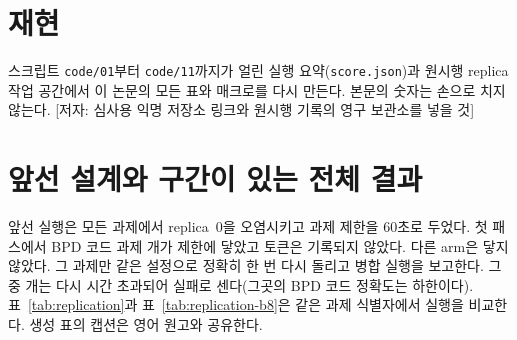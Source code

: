 \documentclass[11pt]{article}
\newcommand{\todo}[1]{{\color{red}[저자: #1]}}
\begin{document}
\section*{재현}
스크립트 \texttt{code/01}부터 \texttt{code/11}까지가 얼린 실행 요약(\texttt{score.json})과 원시행 replica 작업 공간에서 이 논문의 모든 표와 매크로를 다시 만든다. 본문의 숫자는 손으로 치지 않는다.
\todo{심사용 익명 저장소 링크와 원시행 기록의 영구 보관소를 넣을 것}




\appendix
\section{앞선 설계와 구간이 있는 전체 결과}
\label{app:full}
앞선 실행은 모든 과제에서 replica~0을 오염시키고 과제 제한을 60초로 두었다. 첫 패스에서 BPD 코드 과제 \CountBSixBpdCodeTimeout{}개가 제한에 닿았고 토큰은 기록되지 않았다. 다른 arm은 닿지 않았다. 그 과제만 같은 설정으로 정확히 한 번 다시 돌리고 병합 실행을 보고한다. 그중 \CountBSixRBpdCodeTimeout{}개는 다시 시간 초과되어 실패로 센다(그곳의 BPD 코드 정확도는 하한이다).
표~\ref{tab:replication}과 표~\ref{tab:replication-b8}은 같은 과제 식별자에서 실행을 비교한다.
생성 표의 캡션은 영어 원고와 공유한다.















\end{document}
